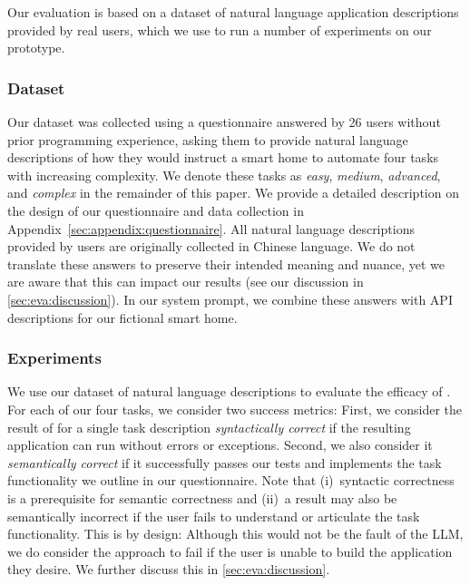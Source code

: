 Our evaluation is based on a dataset of natural language application descriptions provided by real users, which we use to run a number of experiments on our \sysname{} prototype.

\subsubsection{Dataset}

Our dataset was collected using a questionnaire answered by 26 users without prior programming experience, asking them to provide natural language descriptions of how they would instruct a smart home to automate four tasks with increasing complexity.
We denote these tasks as \emph{easy}, \emph{medium}, \emph{advanced}, and \emph{complex} in the remainder of this paper.
We provide a detailed description on the design of our questionnaire and data collection in Appendix~\ref{sec:appendix:questionnaire}.
All natural language descriptions provided by users are originally collected in Chinese language.
We do not translate these answers to preserve their intended meaning and nuance, yet we are aware that this can impact our results (see our discussion in \cref{sec:eva:discussion}).
In our system prompt, we combine these answers with API descriptions for our fictional smart home.



\subsubsection{Experiments}

We use our dataset of natural language descriptions to evaluate the efficacy of \sysname{}.
For each of our four tasks, we consider two success metrics:
First, we consider the result of \sysname{} for a single task description \emph{syntactically correct} if the resulting application can run without errors or exceptions.
Second, we also consider it \emph{semantically correct} if it successfully passes our tests and implements the task functionality we outline in our questionnaire.
Note that (i)~syntactic correctness is a prerequisite for semantic correctness and (ii)~a result may also be semantically incorrect if the user fails to understand or articulate the task functionality.
This is by design: Although this would not be the fault of the LLM, we do consider the \sysname{} approach to fail if the user is unable to build the application they desire.
We further discuss this in \cref{sec:eva:discussion}.

